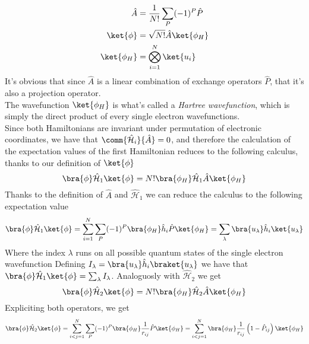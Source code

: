 \documentclass[a4paper, 11pt]{book}
\newcommand{\1}{\opr{\mathds{1}}}
\newcommand{\ham}{\mathcal{H}}
\newcommand{\opr}[1]{\hat{#1}}
\theoremstyle{plain}
\begin{document}
	\begin{equation}
		\begin{aligned}
			\opr{A}&=\frac{1}{N!}\sum_{P}(-1)^P\opr{P}\\
			\ket{\phi}&=\sqrt{N!}\opr{A}\ket{\phi_H}\\
			\ket{\phi_H}&=\bigotimes_{i=1}^N\ket{u_i}
		\end{aligned}
		\label{eq:hartreeantisymmket}
	\end{equation}
	It's obvious that since $\opr{A}$ is a linear combination of exchange operators $\opr{P}$, that it's also a projection operator.\\
	The wavefunction $\ket{\phi_H}$ is what's called a \textit{Hartree wavefunction}, which is simply the direct product of every single electron wavefunctions.\\
	Since both Hamiltonians are invariant under permutation of electronic coordinates, we have that $\comm{\opr{\ham}_i}{\opr{A}}=0$, and therefore the calculation of the expectation values of the first Hamiltonian reduces to the following calculus, thanks to our definition of $\ket{\phi}$
	\begin{equation}
		\bra{\phi}\opr{\ham}_1\ket{\phi}=N!\bra{\phi_H}\opr{\ham}_1\opr{A}\ket{\phi_H}
		\label{eq:ham1expvalhftheory}
	\end{equation}
	Thanks to the definition of $\opr{A}$ and $\opr{\ham}_1$ we can reduce the calculus to the following expectation value
	\begin{equation}
		\bra{\phi}\opr{\ham}_1\ket{\phi}=\sum_{i=1}^N\sum_P(-1)^P\bra{\phi_H}\opr{h}_i\opr{P}\ket{\phi_H}=\sum_{\lambda}\bra{u_\lambda}\opr{h}_i\ket{u_\lambda}
		\label{eq:ham1hftheorysinglelec}
	\end{equation}
	Where the index $\lambda$ runs on all possible quantum states of the single electron wavefunction
	Defining $I_\lambda=\bra{u_\lambda}\opr{h}_i\braket{u_\lambda}$ we have that $\bra{\phi}\opr{\ham}_1\ket{\phi}=\sum_\lambda I_\lambda$. Analoguosly with $\opr{\ham}_2$ we get
	\begin{equation}
		\bra{\phi}\opr{\ham}_2\ket{\phi}=N!\bra{\phi_H}\opr{\ham}_2\opr{A}\ket{\phi_H}
		\label{eq:ham2}
	\end{equation}
	Expliciting both operators, we get
	\begin{equation}
		\bra{\phi}\opr{\ham}_2\ket{\phi}=\sum_{i<j=1}^N\sum_P(-1)^P\bra{\phi_H}\frac{1}{r_{ij}}\opr{P}\ket{\phi_H}=\sum_{i<j=1}^N\bra{\phi_H}\frac{1}{r_{ij}}\left( 1-\opr{P}_{ij} \right)\ket{\phi_H}
		\label{eq:ham2hftheory}
	\end{equation}
\end{document}
